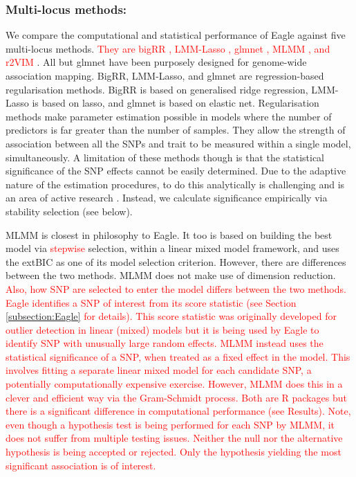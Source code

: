 \documentclass{article}
\begin{document}
 \subsubsection{ Multi-locus methods:} We compare the computational and statistical performance of Eagle against five multi-locus methods. \textcolor{red}{They are bigRR  \citep{shen2013novel}, LMM-Lasso \citep{rakitsch2013lasso}, glmnet \citep{Friedman2010glmnet}, 
MLMM \citep{segura2012efficient}, and r2VIM \citep{szymczak2016r2vim}}.  All but glmnet have been purposely designed for genome-wide association mapping. 
BigRR, LMM-Lasso, and glmnet are regression-based regularisation 
methods. BigRR is based on generalised ridge regression, LMM-Lasso is based on lasso, and glmnet is based on elastic net. 
Regularisation methods make parameter estimation possible in models  where the number of predictors is far greater than the number of samples. 
They allow the strength of association between all the SNPs and trait to be measured within a single model, simultaneously. 
A limitation of these methods though is that the statistical significance of the SNP effects cannot be easily determined. 
 Due to the adaptive nature of the estimation procedures, to do this 
analytically is challenging and is an area of active research \citep{lockhart2014significance}. Instead, we calculate significance empirically via 
stability selection (see below). 

MLMM is closest in philosophy to Eagle. It too is based on building the best model via \textcolor{red}{stepwise} selection, 
within  a linear mixed model framework, and uses the 
extBIC as one of its model selection criterion. However, there are differences between the two methods. 
MLMM does not make use of dimension reduction. \textcolor{red}{Also, how SNP are selected to enter the model differs between the 
two methods. 
Eagle identifies a SNP of interest from its score statistic (see Section \ref{subsection:Eagle} for details).  This score statistic was originally developed for 
outlier detection in linear (mixed) models but it is being used by Eagle to identify 
SNP with unusually large random effects. MLMM instead uses 
the statistical significance of a SNP,  when treated as a fixed effect in the model. This involves fitting a separate linear mixed model for each candidate SNP, a potentially
computationally expensive exercise. However, MLMM does this in a clever and efficient way via the Gram-Schmidt process. 
Both are R packages but there is a significant difference in computational performance (see Results). 
Note, even though a hypothesis test is being performed for each SNP by MLMM, it does not suffer from multiple testing issues. 
Neither the null nor the alternative hypothesis is being accepted or rejected. Only the hypothesis yielding the most significant association is 
of interest. }
\end{document}
